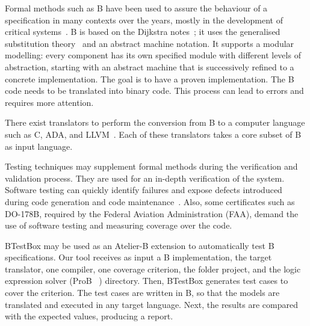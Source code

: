 \documentclass[runningheads]{llncs}
\begin{document}

Formal methods such as B have been used to assure the behaviour of a specification in many contexts over the years, mostly in the development of critical systems~\cite{leuschel:2005,valerio_thesis:2016}. 
B is based on the Dijkstra notes~\cite{dijkstra1976discipline}; it uses the generalised substitution theory~\cite{hoare2002proof} and an abstract machine notation. 
It supports a modular modelling:  every component has its own specified module with different levels of abstraction, starting with an abstract machine that is successively refined to a concrete implementation. 
The goal is to have a proven implementation. 
The B code needs to be translated into binary code.
This process can lead to errors and requires more attention. 



There exist translators to perform the conversion from B to a computer language such as C, ADA, and LLVM~\cite{deharbebtestbox}. 
Each of these translators takes a core subset of B as input language. 

Testing techniques may supplement formal methods during the verification and validation process. 
They are used for an in-depth verification of the system. 
Software testing can quickly identify failures and expose defects introduced during code generation and code maintenance~\cite{deharbebtestbox}. 
Also, some certificates such as DO-178B, required by the Federal Aviation Administration (FAA), demand the use of software testing and measuring coverage over the code.

BTestBox may be used as an Atelier-B extension to automatically test B specifications. 
Our tool receives as input a B implementation, the target translator, one compiler, one coverage criterion, the folder project, and the logic expression solver (ProB ~\cite{1_leuschel_2017}) %
directory. 
Then, BTestBox generates test cases to cover the criterion.
The test cases are written in B, so that the models are translated and executed in any target language. 
Next, the results are compared with the expected values, producing a report. 
\end{document}
